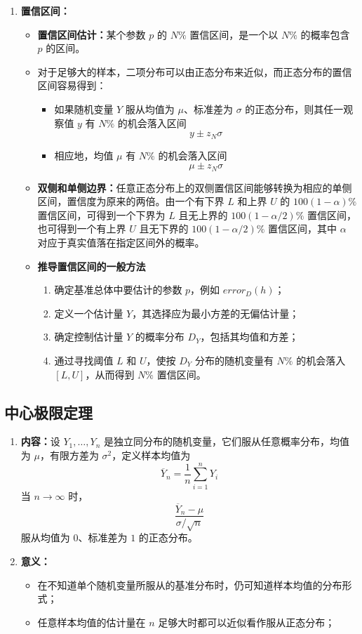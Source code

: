 \documentclass[../main.tex]{subfiles}
\begin{document}
\begin{enumerate}
    \item \textbf{置信区间：}
    \begin{itemize}
        \item \textbf{置信区间估计：}某个参数 $p$ 的 $N\%$ 置信区间，是一个以 $N\%$ 的概率包含 $p$ 的区间。
        \item 对于足够大的样本，二项分布可以由正态分布来近似，而正态分布的置信区间容易得到：
        \begin{itemize}
            \item 如果随机变量 $Y$ 服从均值为 $\mu$、标准差为 $\sigma$ 的正态分布，则其任一观察值 $y$ 有 $N\%$ 的机会落入区间
            $$
            y \pm z_N \sigma
            $$
            \item 相应地，均值 $\mu$ 有 $N\%$ 的机会落入区间
            $$
            \mu \pm z_N \sigma
            $$
        \end{itemize}
        \item \textbf{双侧和单侧边界：}任意正态分布上的双侧置信区间能够转换为相应的单侧区间，置信度为原来的两倍。由一个有下界 $L$ 和上界 $U$ 的 $100(1-\alpha)\%$ 置信区间，可得到一个下界为 $L$ 且无上界的 $100(1-\alpha/2)\%$ 置信区间，也可得到一个有上界 $U$ 且无下界的 $100(1-\alpha/2)\%$ 置信区间，其中 $\alpha$ 对应于真实值落在指定区间外的概率。
        \item \textbf{推导置信区间的一般方法}
        \begin{enumerate}
            \item 确定基准总体中要估计的参数 $p$，例如 $error_D(h)$；
            \item 定义一个估计量 $Y$，其选择应为最小方差的无偏估计量；
            \item 确定控制估计量 $Y$ 的概率分布 $D_Y$，包括其均值和方差；
            \item 通过寻找阈值 $L$ 和 $U$，使按 $D_Y$ 分布的随机变量有 $N\%$ 的机会落入 $[L,U]$，从而得到 $N\%$ 置信区间。
        \end{enumerate}
    \end{itemize}
\end{enumerate}
\subsection{中心极限定理}\label{sec:central-limit-theorem}
\begin{enumerate}
    \item \textbf{内容：}设 ${Y}_{1},\ldots,{Y}_{n}$ 是独立同分布的随机变量，它们服从任意概率分布，均值为 $\mu$，有限方差为 $\sigma^2$，定义样本均值为
    $$
    \overline{Y}_n=\frac{1}{n}\sum_{i=1}^n Y_i
    $$
    当 $n\to\infty$ 时，
    $$
    \frac{\overline{Y}_n-\mu}{\sigma/\sqrt{n}}
    $$
    服从均值为 $0$、标准差为 $1$ 的正态分布。
    \item \textbf{意义：}
    \begin{itemize}
        \item 在不知道单个随机变量所服从的基准分布时，仍可知道样本均值的分布形式；
        \item 任意样本均值的估计量在 $n$ 足够大时都可以近似看作服从正态分布；
    \end{itemize}
\end{enumerate}
\end{document}
